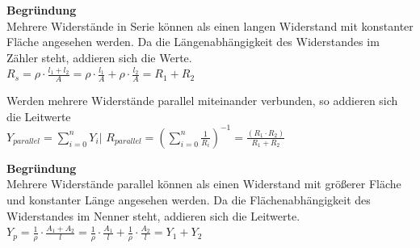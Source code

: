 \vspace{1em}

\textbf{Begründung} \\
Mehrere Widerstände in Serie können als einen langen Widerstand mit konstanter Fläche angesehen werden. Da die Längenabhängigkeit des Widerstandes im Zähler steht, addieren sich die Werte. \\
$\displaystyle R_s = \rho \cdot \frac{l_1+l_2}{A} = \rho \cdot \frac{l_1}{A}  + \rho \cdot \frac{l_2}{A}  = R_1 + R_2 $
\fix
\begin{center}
\end{center}
\fix



\beginip
Werden mehrere Widerstände parallel miteinander verbunden, so addieren sich die Leitwerte \\
\formulaBegin
$\displaystyle Y_{parallel} = \sum_{i=0}^n Y_i \Bigg\rvert$
$\displaystyle R_{parallel} = \left(\sum_{i=0}^n \frac{1}{R_i}\right)^{-1} = \frac{(R_1 \cdot R_2)}{R_1 + R_2}$
\formulaEnd
\iend

\vspace{1em}

\textbf{Begründung} \\
Mehrere Widerstände parallel können als einen Widerstand mit größerer Fläche und konstanter Länge angesehen werden. Da die Flächenabhängigkeit des Widerstandes im Nenner steht, addieren sich die Leitwerte. \\
$\displaystyle Y_p = \frac{1}{\rho} \cdot \frac{A_1 + A_2}{l} = \frac{1}{\rho} \cdot \frac{A_1}{l}  + \frac{1}{\rho} \cdot \frac{A_2}{l}  = Y_1 + Y_2 $


\begin{center}
\end{center}




